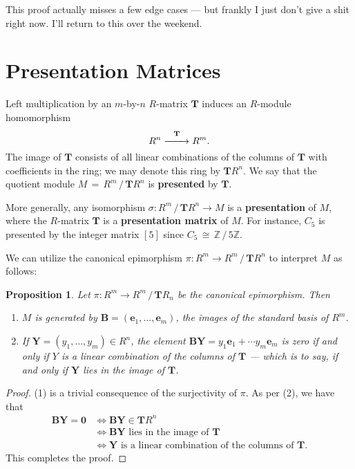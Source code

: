 \documentclass[11pt]{article}
\newtheorem{proposition}{Proposition}
\renewcommand{\longrightarrow}{\xrightarrow{\hspace*{0.7cm}}}
\renewcommand{\vec}[1]{\mathbf{#1}}
\newcommand{\mat}[1]{\mathbf{#1}}
\begin{document}
This proof actually misses a few edge cases --- but frankly I just don't give a shit right now. I'll return to this over the weekend.


\section{Presentation Matrices}

Left multiplication by an $m$-by-$n$ $R$-matrix $\mat{T}$ induces an $R$-module homomorphism
\[
  R^{n} \stackrel{\mat{T}}{\longrightarrow} R^{m}. 
\]
The image of $\mat{T}$ consists of all linear combinations of the columns of $\mat{T}$ with coefficients in the ring; we may denote this ring by $\mat{T} R^{n}$. We say that the quotient module $M \, = \, R^{m} \, / \, \mat{T} R^{n}$ is \textbf{presented} by $\mat{T}$. 

More generally, any isomorphism $\sigma : R^{m} \, / \, \mat{T} R^{n} \to M$ is a \textbf{presentation} of $M$, where the $R$-matrix $\mat{T}$ is a \textbf{presentation matrix} of $M$. For instance, $C_{5}$ is presented by the integer matrix $[5]$ since $C_{5} \, \cong \, \mathbb{Z} \, / \, 5 \mathbb{Z}$.

We can utilize the canonical epimorphism $\pi : R^{m} \to R^{m} \, / \, \mat{T} R^{n}$ to interpret $M$ as follows:

\newpage

\begin{adjustwidth}{0.5cm}{}
  \begin{proposition}
    Let $\pi : R^{m} \to R^{m} \, / \, \mat{T} R_{n}$ be the canonical epimorphism. Then 
    \begin{enumerate}
      \item $M$ is generated by $\vec{B} = (\vec{e}_{1}, \ldots, \vec{e}_{m})$, the images of the standard basis of $R^{m}$.
      \item If $\vec{Y} = (y_{1}, \ldots, y_{m}) \in R^{n}$, the element $\mat{B}\vec{Y} = y_{1} \vec{e}_{1} + \cdots y_{m} \vec{e}_{m}$ is zero if and only if $Y$ is a linear combination of the columns of $\vec{T}$ --- which is to say, if and only if $\vec{Y}$ lies in the image of $\mat{T}$.
    \end{enumerate}
  \end{proposition}
  \begin{proof}
    (1) is a trivial consequence of the surjectivity of $\pi$. As per (2), we have that
    \begin{align*}
      \text{$\vec{BY} = \vec{0}$} & \iff \text{$\vec{BY} \in \mat{T} R^{n}$} \\ 
                                  & \iff \text{$\vec{BY}$ lies in the image of $\mat{T}$} \\
                                  & \iff \text{$\vec{Y}$ is a linear combination of the columns of $\mat{T}$}.
    \end{align*}
    This completes the proof.
  \end{proof}
\end{adjustwidth}

\end{document}
